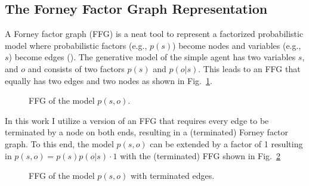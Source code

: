 \subsection{The Forney Factor Graph Representation}
A Forney factor graph (FFG) is a neat tool to represent a factorized probabilistic model where probabilistic factors (e.g., \(p(s)\)) become nodes and variables (e.g., \(s\)) become edges (\cite{loeliger2004}). The generative model of the simple agent has two variables \(s\), and \(o\) and consists of two factors \(p(s)\) and \(p(o|s)\). This leads to an FFG that equally has two edges and two nodes as shown in Fig.~\ref{fig:1}.
\begin{figure}[htbp]
    \centering


    \caption{FFG of the model \(p(s,o)\).}
    \label{fig:1}
\end{figure}

In this work I utilize a version of an FFG that requires every edge to be terminated by a node on both ends, resulting in a (terminated) Forney factor graph. To this end, the model \(p(s,o)\) can be extended by a factor of 1 resulting in \(p(s,o)=p(s)p(o|s)\cdot1\) with the (terminated) FFG shown in Fig.~\ref{fig:2}
\begin{figure}[htbp]
    \centering


    \caption{FFG of the model \(p(s,o)\) with terminated edges.}
    \label{fig:2}
\end{figure}

